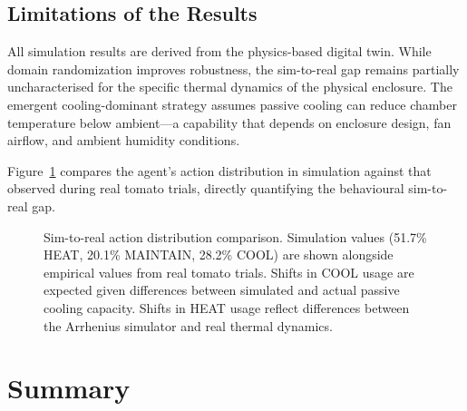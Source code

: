     \subsection{Limitations of the Results}

    All simulation results are derived from the physics-based digital twin. While domain randomization improves robustness, the sim-to-real gap remains partially uncharacterised for the specific thermal dynamics of the physical enclosure. The emergent cooling-dominant strategy assumes passive cooling can reduce chamber temperature below ambient---a capability that depends on enclosure design, fan airflow, and ambient humidity conditions.

    Figure~\ref{fig:sim_real_actions} compares the agent's action distribution in simulation against that observed during real tomato trials, directly quantifying the behavioural sim-to-real gap.

    \begin{figure}[H]
        \centering
        \caption{Sim-to-real action distribution comparison. Simulation values (51.7\% HEAT, 20.1\% MAINTAIN, 28.2\% COOL) are shown alongside empirical values from real tomato trials. Shifts in COOL usage are expected given differences between simulated and actual passive cooling capacity. Shifts in HEAT usage reflect differences between the Arrhenius simulator and real thermal dynamics.}
        \label{fig:sim_real_actions}
    \end{figure}


\section{Summary}
    \label{sec:Results Summary}

